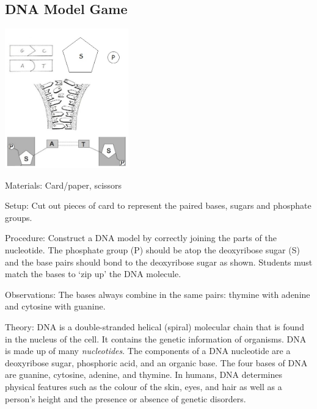 \begin{multicols}{2}
\columnbreak

\subsection{DNA Model Game} %

\begin{center}
\includegraphics[width=0.4\textwidth]{./img/dna-game.jpg}
\end{center}

\begin{description*}
\item[Materials:]{Card/paper, scissors}
\item[Setup:]{Cut out pieces of card to
represent the paired bases, sugars and phosphate groups.}
\item[Procedure:]{Construct a DNA model by correctly joining the parts of the nucleotide. The phosphate group (P) should be atop the deoxyribose sugar (S) and the
base pairs should bond to the deoxyribose sugar as shown. Students must match the bases to
`zip up' the DNA molecule.}
\item[Observations:]{The bases
always combine in the same pairs:
thymine with adenine and
cytosine with guanine.}
\item[Theory:]{DNA is a double-stranded helical (spiral) molecular chain that is found in the nucleus of the cell. It contains the genetic information of organisms. DNA is made up of many \emph{nucleotides}. The components of a DNA nucleotide are a deoxyribose sugar, phosphoric acid, and an organic base. The four bases of DNA are guanine, cytosine, adenine, and thymine. In humans, DNA determines physical features such as the colour of the skin, eyes, and hair as well as a person's height and the presence or absence of genetic disorders.}
\end{description*}


\end{multicols}

